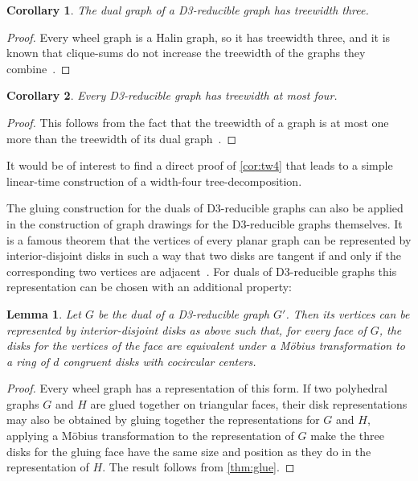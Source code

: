 \documentclass{article}
\newtheorem{lemma}{Lemma}
\newtheorem{corollary}{Corollary}
\begin{document}
\begin{corollary}
The dual graph of a D3-reducible graph has treewidth three.
\end{corollary}

\begin{proof}
Every wheel graph is a Halin graph, so it has treewidth three, and it is known that clique-sums do not increase the treewidth of the graphs they combine~\cite{Lov-BAMS-06}.
\end{proof}

\begin{corollary}
\label{cor:tw4}
Every D3-reducible graph has treewidth at most four.
\end{corollary}

\begin{proof}
This follows from the fact that the treewidth of a graph is at most one more than the treewidth of its dual graph~\cite{BouMazTod-DM-03}.
\end{proof}

It would be of interest to find a direct proof of \autoref{cor:tw4} that leads to a simple linear-time construction of a width-four tree-decomposition.

The gluing construction for the duals of D3-reducible graphs can also be applied in the construction of graph drawings for the D3-reducible graphs themselves. It is a famous theorem that the vertices of every planar graph can be represented by interior-disjoint disks in such a way that two disks are tangent if and only if the corresponding two vertices are adjacent~\cite{Ste-ICP-05}. For duals of D3-reducible graphs this representation can be chosen with an additional property:

\begin{lemma}
\label{lem:cpack}
Let $G$ be the dual of a D3-reducible graph $G'$. Then its vertices can be represented by interior-disjoint disks as above such that, for every face of $G$, the disks for the vertices of the face are equivalent under a M\"obius transformation to a ring of $d$ congruent disks with cocircular centers.
\end{lemma}

\begin{proof}
Every wheel graph has a representation of this form. If two polyhedral graphs $G$ and $H$ are glued together on triangular faces, their disk representations may also be obtained by gluing together the representations for $G$ and $H$, applying a M\"obius transformation to the representation of $G$ make the three disks for the gluing face have the same size and position as they do in the representation of $H$.  The result follows from \autoref{thm:glue}.
\end{proof}
\end{document}
